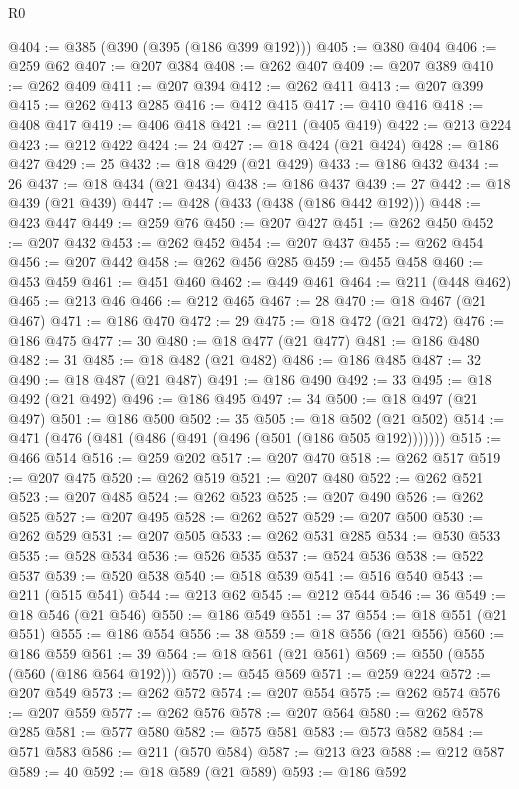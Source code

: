 \begin{lexlean}{R0}
\begin{coremodule}
@404 := @385 (@390 (@395 (@186 @399 @192)))
@405 := @380 @404
@406 := @259 @62
@407 := @207 @384
@408 := @262 @407
@409 := @207 @389
@410 := @262 @409
@411 := @207 @394
@412 := @262 @411
@413 := @207 @399
@415 := @262 @413 @285
@416 := @412 @415
@417 := @410 @416
@418 := @408 @417
@419 := @406 @418
@421 := @211 (@405 @419)
@422 := @213 @224
@423 := @212 @422
@424 := 24
@427 := @18 @424 (@21 @424)
@428 := @186 @427
@429 := 25
@432 := @18 @429 (@21 @429)
@433 := @186 @432
@434 := 26
@437 := @18 @434 (@21 @434)
@438 := @186 @437
@439 := 27
@442 := @18 @439 (@21 @439)
@447 := @428 (@433 (@438 (@186 @442 @192)))
@448 := @423 @447
@449 := @259 @76
@450 := @207 @427
@451 := @262 @450
@452 := @207 @432
@453 := @262 @452
@454 := @207 @437
@455 := @262 @454
@456 := @207 @442
@458 := @262 @456 @285
@459 := @455 @458
@460 := @453 @459
@461 := @451 @460
@462 := @449 @461
@464 := @211 (@448 @462)
@465 := @213 @46
@466 := @212 @465
@467 := 28
@470 := @18 @467 (@21 @467)
@471 := @186 @470
@472 := 29
@475 := @18 @472 (@21 @472)
@476 := @186 @475
@477 := 30
@480 := @18 @477 (@21 @477)
@481 := @186 @480
@482 := 31
@485 := @18 @482 (@21 @482)
@486 := @186 @485
@487 := 32
@490 := @18 @487 (@21 @487)
@491 := @186 @490
@492 := 33
@495 := @18 @492 (@21 @492)
@496 := @186 @495
@497 := 34
@500 := @18 @497 (@21 @497)
@501 := @186 @500
@502 := 35
@505 := @18 @502 (@21 @502)
@514 := @471 (@476 (@481 (@486 (@491 (@496 (@501 (@186 @505 @192)))))))
@515 := @466 @514
@516 := @259 @202
@517 := @207 @470
@518 := @262 @517
@519 := @207 @475
@520 := @262 @519
@521 := @207 @480
@522 := @262 @521
@523 := @207 @485
@524 := @262 @523
@525 := @207 @490
@526 := @262 @525
@527 := @207 @495
@528 := @262 @527
@529 := @207 @500
@530 := @262 @529
@531 := @207 @505
@533 := @262 @531 @285
@534 := @530 @533
@535 := @528 @534
@536 := @526 @535
@537 := @524 @536
@538 := @522 @537
@539 := @520 @538
@540 := @518 @539
@541 := @516 @540
@543 := @211 (@515 @541)
@544 := @213 @62
@545 := @212 @544
@546 := 36
@549 := @18 @546 (@21 @546)
@550 := @186 @549
@551 := 37
@554 := @18 @551 (@21 @551)
@555 := @186 @554
@556 := 38
@559 := @18 @556 (@21 @556)
@560 := @186 @559
@561 := 39
@564 := @18 @561 (@21 @561)
@569 := @550 (@555 (@560 (@186 @564 @192)))
@570 := @545 @569
@571 := @259 @224
@572 := @207 @549
@573 := @262 @572
@574 := @207 @554
@575 := @262 @574
@576 := @207 @559
@577 := @262 @576
@578 := @207 @564
@580 := @262 @578 @285
@581 := @577 @580
@582 := @575 @581
@583 := @573 @582
@584 := @571 @583
@586 := @211 (@570 @584)
@587 := @213 @23
@588 := @212 @587
@589 := 40
@592 := @18 @589 (@21 @589)
@593 := @186 @592

\end{coremodule}
\end{lexlean}
